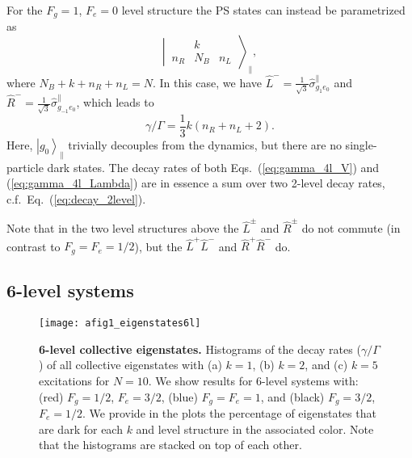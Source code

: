 \documentclass[aps,prx,superscriptaddress,twocolumn,notitlepage,nofootinbib,longbibliography]{revtex4-2}
\newcommand{\ket}[1]{\left|#1\right>}
\begin{document}
For the $F_g=1$, $F_e=0$ level structure the PS states can instead be parametrized as
\begin{equation}
	\left|\, \begin{matrix}  & k &  \\ n_R & N_B & n_L \end{matrix} \,\right\rangle_\parallel ,
\end{equation}
where $N_B+k+n_R+n_L=N$. In this case, we have $\hat{L}^-=\frac{1}{\sqrt{3}} \hat{\sigma}^\parallel_{g_{1}e_0}$ and $\hat{R}^-=\frac{1}{\sqrt{3}} \hat{\sigma}^\parallel_{g_{-1}e_0}$, which leads to
\begin{equation}
    \gamma/\Gamma = \frac{1}{3} k(n_R+n_L+2).
\label{eq:gamma_4l_Lambda}
\end{equation}
Here, $\ket{g_0}_\parallel$ trivially decouples from the dynamics, but there are no single-particle dark states.
The decay rates of both Eqs.~(\ref{eq:gamma_4l_V}) and (\ref{eq:gamma_4l_Lambda}) are in essence a sum over two 2-level decay rates, c.f.~Eq.~(\ref{eq:decay_2level}).

Note that in the two level structures above the $\hat{L}^\pm$ and $\hat{R}^\pm$ do not commute (in contrast to $F_g=F_e=1/2$), but the $\hat{L}^+\hat{L}^-$ and $\hat{R}^+\hat{R}^-$ do.








\subsection{6-level systems}

\begin{figure}[!t]
\centering
\texttt{[image: afig1\_eigenstates6l]}
\caption{\textbf{6-level collective eigenstates.} Histograms of the decay rates ($\gamma/\Gamma$) of all collective eigenstates with (a) $k=1$, (b) $k=2$, and (c) $k=5$ excitations for $N=10$. We show results for 6-level systems with: (red) $F_g=1/2$, $F_e=3/2$, (blue) $F_g=F_e=1$, and (black) $F_g=3/2$, $F_e=1/2$. We provide in the plots the percentage of eigenstates that are dark for each $k$ and level structure in the associated color. Note that the histograms are stacked on top of each other.}
\label{fig:app_eigenstates6l}
\end{figure}
\end{document}
